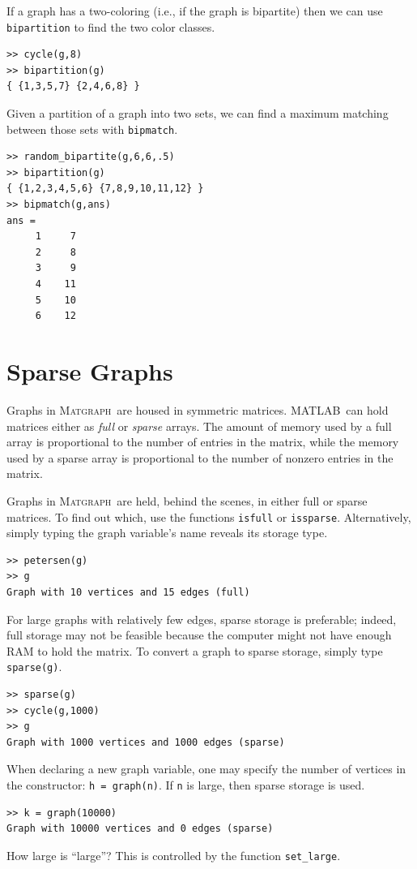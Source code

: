 \documentclass[12pt]{amsart}
\newcommand\matlab{MATLAB}
\newcommand\matgraph{\textsc{Matgraph}}
\begin{document}
If a graph has a two-coloring (i.e., if the graph is bipartite) then
we can use \verb|bipartition| to find the two color classes.
\begin{verbatim}
>> cycle(g,8)
>> bipartition(g)
{ {1,3,5,7} {2,4,6,8} }
\end{verbatim}
Given a partition of a graph into two sets, we can find a maximum
matching between those sets with \verb|bipmatch|.
\begin{verbatim}
>> random_bipartite(g,6,6,.5)
>> bipartition(g)
{ {1,2,3,4,5,6} {7,8,9,10,11,12} }
>> bipmatch(g,ans)
ans =
     1     7
     2     8
     3     9
     4    11
     5    10
     6    12
\end{verbatim}


\section{Sparse Graphs}
Graphs in \matgraph\ are housed in symmetric matrices. \matlab\ can
hold matrices either as \emph{full} or \emph{sparse} arrays. The
amount of memory used by a full array is proportional to the number of
entries in the matrix, while the memory used by a sparse array is
proportional to the number of nonzero entries in the matrix. 

Graphs in \matgraph\ are held, behind the scenes, in either full or
sparse matrices. To find out which, use the functions \verb|isfull| or
\verb|issparse|. Alternatively, simply typing the graph variable's
name reveals its storage type.
\begin{verbatim}
>> petersen(g)
>> g
Graph with 10 vertices and 15 edges (full)
\end{verbatim}
For large graphs with relatively few edges, sparse storage is
preferable; indeed, full storage may not be feasible because the
computer might not have enough RAM to hold the matrix. To convert a
graph to sparse storage, simply type \verb|sparse(g)|. 
\begin{verbatim}
>> sparse(g)
>> cycle(g,1000)
>> g
Graph with 1000 vertices and 1000 edges (sparse)
\end{verbatim}
When declaring a new graph variable, one may specify the number of
vertices in the constructor: \verb|h = graph(n)|. If \verb|n| is large,
then sparse storage is used. 
\begin{verbatim}
>> k = graph(10000)
Graph with 10000 vertices and 0 edges (sparse)
\end{verbatim}
How large is ``large''? This is controlled by the function
\verb|set_large|. 
 
\end{document}
